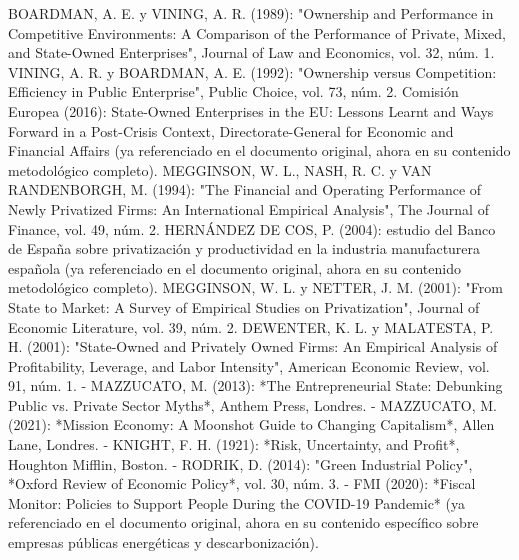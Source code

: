 \documentclass[10pt,a4paper]{article}
\begin{document}
BOARDMAN, A. E. y VINING, A. R. (1989): "Ownership and Performance in Competitive Environments: A Comparison of the Performance of Private, Mixed, and State-Owned Enterprises", Journal of Law and Economics, vol. 32, núm. 1.
VINING, A. R. y BOARDMAN, A. E. (1992): "Ownership versus Competition: Efficiency in Public Enterprise", Public Choice, vol. 73, núm. 2.
Comisión Europea (2016): State-Owned Enterprises in the EU: Lessons Learnt and Ways Forward in a Post-Crisis Context, Directorate-General for Economic and Financial Affairs (ya referenciado en el documento original, ahora en su contenido metodológico completo).
MEGGINSON, W. L., NASH, R. C. y VAN RANDENBORGH, M. (1994): "The Financial and Operating Performance of Newly Privatized Firms: An International Empirical Analysis", The Journal of Finance, vol. 49, núm. 2.
HERNÁNDEZ DE COS, P. (2004): estudio del Banco de España sobre privatización y productividad en la industria manufacturera española (ya referenciado en el documento original, ahora en su contenido metodológico completo).
MEGGINSON, W. L. y NETTER, J. M. (2001): "From State to Market: A Survey of Empirical Studies on Privatization", Journal of Economic Literature, vol. 39, núm. 2.
DEWENTER, K. L. y MALATESTA, P. H. (2001): "State-Owned and Privately Owned Firms: An Empirical Analysis of Profitability, Leverage, and Labor Intensity", American Economic Review, vol. 91, núm. 1.
- MAZZUCATO, M. (2013): *The Entrepreneurial State: Debunking Public vs. Private Sector Myths*, Anthem Press, Londres.
- MAZZUCATO, M. (2021): *Mission Economy: A Moonshot Guide to Changing Capitalism*, Allen Lane, Londres.
- KNIGHT, F. H. (1921): *Risk, Uncertainty, and Profit*, Houghton Mifflin, Boston.
- RODRIK, D. (2014): "Green Industrial Policy", *Oxford Review of Economic Policy*, vol. 30, núm. 3.
- FMI (2020): *Fiscal Monitor: Policies to Support People During the COVID-19 Pandemic* (ya referenciado en el documento original, ahora en su contenido específico sobre empresas públicas energéticas y descarbonización).

\clearpage
\end{document}
